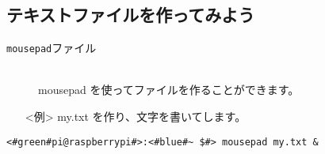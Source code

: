 \subsection{テキストファイルを作ってみよう}
\begin{description}
\item[\texttt{mousepad}\textvisiblespace ファイル]\mbox{}\\
mousepad を使ってファイルを作ることができます。
\end{description}
\begin{itemize}
\item[<例>]my.txt を作り、文字を書いてします。
\end{itemize}
\begin{lstlisting}[caption=mousepadの例, label=mousepad]
<#green#pi@raspberrypi#>:<#blue#~ $#> mousepad my.txt &
\end{lstlisting}
\begin{tcolorbox}[title=\useOmetoi]
\begin{enumerate}
\end{enumerate}
\end{tcolorbox}
